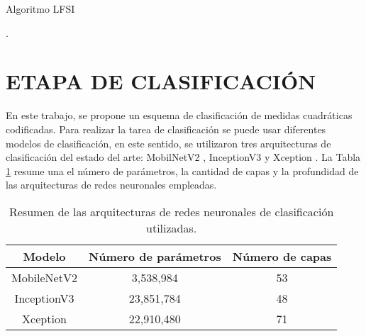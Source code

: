 \begin{algoritmo}[!h]
    \caption{Algoritmo LFSI }\label{fsi_algo}
    \begin{algorithmic}[1]
		.		
		\EndFor
	\end{algorithmic}
    \label{alg_1}
\end{algoritmo}


\section{ETAPA DE CLASIFICACIÓN}

En este trabajo, se propone un esquema de clasificación de medidas cuadráticas codificadas. Para realizar la tarea de clasificación se puede usar diferentes modelos de clasificación, en este sentido, se utilizaron tres arquitecturas de clasificación del estado del arte: MobilNetV2 , InceptionV3   y Xception . La Tabla \ref{tab:comp_class_models} resume una el número de parámetros, la cantidad de capas y la profundidad de las arquitecturas de redes neuronales empleadas.

\begin{table}[!h]
\centering
\caption{Resumen de las arquitecturas de redes neuronales de clasificación utilizadas.}
\begin{tabular}{|c|c|c|}
\hline
\textbf{Modelo}      & \textbf{Número de parámetros} & \textbf{Número de capas} \\ \hline
MobileNetV2 & 3,538,984            & 53              \\ \hline
InceptionV3 & 23,851,784           & 48              \\ \hline
Xception    & 22,910,480           & 71              \\ \hline
\end{tabular}
\label{tab:comp_class_models}
\end{table}


